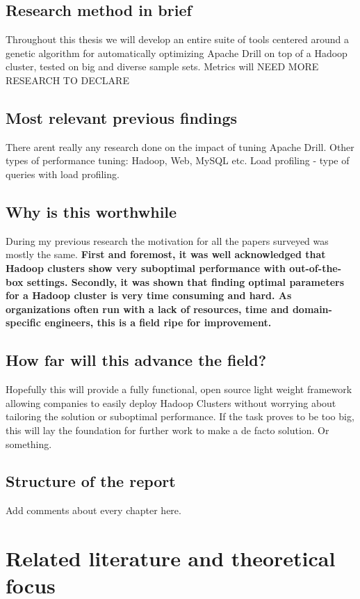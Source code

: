 \documentclass[a4paper,english]{report}
\begin{document}
		\section{Research method in brief}
		Throughout this thesis we will develop an entire suite of tools centered around a genetic algorithm for automatically optimizing Apache Drill on top of a Hadoop cluster, tested on big and diverse sample sets. Metrics will NEED MORE RESEARCH TO DECLARE
		\section{Most relevant previous findings}
		There arent really any research done on the impact of tuning Apache Drill.
		Other types of performance tuning: Hadoop, Web, MySQL etc.
		Load profiling - type of queries with load profiling.
		\section{Why is this worthwhile}
		During my previous research the motivation for all the papers surveyed was mostly the same. \textbf{First and foremost, it was well acknowledged that Hadoop clusters show very suboptimal performance with out-of-the-box settings. Secondly, it was shown that finding optimal parameters for a Hadoop cluster is very time consuming and hard. As organizations often run with a lack of resources, time and domain-specific engineers, this is a field ripe for improvement.}
		\section{How far will this advance the field?}
		Hopefully this will provide a fully functional, open source light weight framework allowing companies to easily deploy Hadoop Clusters without worrying about tailoring the solution or suboptimal performance. If the task proves to be too big, this will lay the foundation for further work to make a de facto solution. Or something.
		\section{Structure of the report}
		Add comments about every chapter here.
	\chapter{Related literature and theoretical focus}
\end{document}
